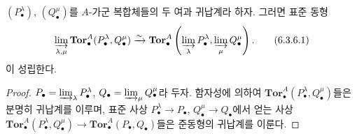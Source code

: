 \begin{proposition}[6.3.6]
\label{III.6.3.6-fr}
$(P_\bullet^\lambda)$, $(Q_\bullet^\mu)$를 $A$-가군 복합체들의 두
여과 귀납계라 하자. 그러면 표준 동형
\[
  \varinjlim_{\lambda,\mu}
  \mathbf{Tor}_\bullet^A(P_\bullet^\lambda,Q_\bullet^\mu)
  \xrightarrow{\sim}
  \mathbf{Tor}_\bullet^A
  \left(\varinjlim_\lambda P_\bullet^\lambda,
        \varinjlim_\mu Q_\bullet^\mu\right).
  \tag{6.3.6.1}\label{III.6.3.6.1.fr}
\]
이 성립한다.
\end{proposition}

\begin{proof}
$P_\bullet=\varinjlim_\lambda P_\bullet^\lambda$,
$Q_\bullet=\varinjlim_\mu Q_\bullet^\mu$라 두자. 함자성에 의하여
$\mathbf{Tor}_\bullet^A(P_\bullet^\lambda,Q_\bullet^\mu)$들은 분명히
귀납계를 이루며, 표준 사상 $P_\bullet^\lambda\to P_\bullet$,
$Q_\bullet^\mu\to Q_\bullet$에서 얻는 사상
$\mathbf{Tor}_\bullet^A(P_\bullet^\lambda,Q_\bullet^\mu)\to
\mathbf{Tor}_\bullet^A(P_\bullet,Q_\bullet)$들은 준동형의 귀납계를
이룬다.



\end{proof}
